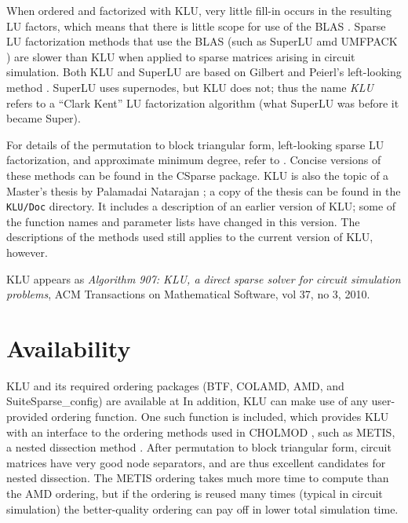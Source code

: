 \documentclass[11pt]{article}
\begin{document}
When ordered and factorized with KLU, very little fill-in occurs in the
resulting LU factors, which means that there is little scope for use of the
BLAS \cite{ACM679a}.  Sparse LU factorization methods that use the BLAS (such
as SuperLU \cite{SuperLU99} amd UMFPACK \cite{Davis03_algo,Davis03}) are slower
than KLU when applied to sparse matrices arising in circuit simulation.  Both
KLU and SuperLU are based on Gilbert and Peierl's left-looking method
\cite{GilbertPeierls88}.  SuperLU uses supernodes, but KLU does not; thus the
name {\em KLU} refers to a ``Clark Kent'' LU factorization algorithm (what
SuperLU was before it became Super).

For details of the permutation to block triangular form, left-looking sparse
LU factorization, and approximate minimum degree, refer to \cite{Davis06book}.
Concise versions of these methods can be found in the CSparse package.  KLU is
also the topic of a Master's thesis by Palamadai Natarajan \cite{Palamadai05};
a copy of
the thesis can be found in the {\tt KLU/Doc} directory.  It includes a
description of an earlier version of KLU; some of the function names and
parameter lists have changed in this version.  The descriptions of the methods
used still applies to the current version of KLU, however.

KLU appears as {\em Algorithm 907: KLU, a direct sparse solver for circuit
simulation problems}, ACM Transactions on Mathematical Software, vol 37, no 3,
2010.

\section{Availability}

KLU and its required ordering packages (BTF, COLAMD, AMD, and
SuiteSparse\_config) are
available at   In
addition, KLU can make use of any user-provided ordering function.  One such
function is included, which provides KLU with an interface to the ordering
methods used in CHOLMOD \cite{ChenDavisHagerRajamanickam06}, such as METIS, a
nested dissection method \cite{KarypisKumar98e}.  After permutation to block
triangular form, circuit matrices have very good node separators, and are thus
excellent candidates for nested dissection.  The METIS ordering takes much more
time to compute than the AMD ordering, but if the ordering is reused many times
(typical in circuit simulation) the better-quality ordering can pay off in
lower total simulation time. 
\end{document}
